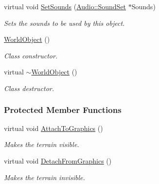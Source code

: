 \begin{DoxyCompactItemize}
virtual void \hyperlink{classMezzanine_1_1WorldObject_a0e117f3bb42577953439ad00e3a08cd3}{SetSounds} (\hyperlink{classMezzanine_1_1Audio_1_1SoundSet}{Audio::SoundSet} $\ast$Sounds)
\begin{DoxyCompactList}\small\item\em Sets the sounds to be used by this object. \item\end{DoxyCompactList}\item 
\hypertarget{classMezzanine_1_1WorldObject_a7718ab150d1337b52715b0db1a4a4762}{
\hyperlink{classMezzanine_1_1WorldObject_a7718ab150d1337b52715b0db1a4a4762}{WorldObject} ()}
\label{classMezzanine_1_1WorldObject_a7718ab150d1337b52715b0db1a4a4762}

\begin{DoxyCompactList}\small\item\em Class constructor. \item\end{DoxyCompactList}\item 
\hypertarget{classMezzanine_1_1WorldObject_a3d7a43cbe188b33cb2c6e6e88aab3db9}{
virtual \hyperlink{classMezzanine_1_1WorldObject_a3d7a43cbe188b33cb2c6e6e88aab3db9}{$\sim$WorldObject} ()}
\label{classMezzanine_1_1WorldObject_a3d7a43cbe188b33cb2c6e6e88aab3db9}

\begin{DoxyCompactList}\small\item\em Class destructor. \item\end{DoxyCompactList}\end{DoxyCompactItemize}
\subsubsection*{Protected Member Functions}
\begin{DoxyCompactItemize}
\item 
\hypertarget{classMezzanine_1_1WorldObject_a0e073941d71cbbd083a257d740b643d6}{
virtual void \hyperlink{classMezzanine_1_1WorldObject_a0e073941d71cbbd083a257d740b643d6}{AttachToGraphics} ()}
\label{classMezzanine_1_1WorldObject_a0e073941d71cbbd083a257d740b643d6}

\begin{DoxyCompactList}\small\item\em Makes the terrain visible. \item\end{DoxyCompactList}\item 
\hypertarget{classMezzanine_1_1WorldObject_a93d52c90fdd9a3ada46b2539012f1bf5}{
virtual void \hyperlink{classMezzanine_1_1WorldObject_a93d52c90fdd9a3ada46b2539012f1bf5}{DetachFromGraphics} ()}
\label{classMezzanine_1_1WorldObject_a93d52c90fdd9a3ada46b2539012f1bf5}

\begin{DoxyCompactList}\small\item\em Makes the terrain invisible. \item\end{DoxyCompactList}\end{DoxyCompactItemize}
